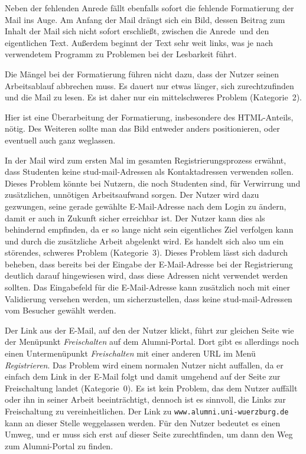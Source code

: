 {
Neben der fehlenden Anrede fällt ebenfalls sofort die fehlende Formatierung der Mail ins Auge. Am Anfang der Mail drängt sich ein Bild, dessen Beitrag zum Inhalt der Mail sich nicht sofort erschließt, zwischen die \glqq Anrede\grqq ~und den eigentlichen Text. Außerdem beginnt der Text sehr weit links, was je nach verwendetem Programm zu Problemen bei der Lesbarkeit führt.
}
{

Die Mängel bei der Formatierung führen nicht dazu, dass der Nutzer seinen Arbeitsablauf abbrechen muss. Es dauert nur etwas länger, sich zurechtzufinden und die Mail zu lesen. Es ist daher nur ein mittelschweres Problem (Kategorie~2).
}
{
Hier ist eine Überarbeitung der Formatierung, insbesondere des HTML-Anteils, nötig. Des Weiteren sollte man das Bild entweder anders positionieren, oder eventuell auch ganz weglassen.
}
\label{prob:frei:mailformat}

{
In der Mail wird zum ersten Mal im gesamten Registrierungsprozess erwähnt, dass Studenten keine stud\hbox{-}mail-Adressen als Kontaktadressen verwenden sollen.
}
{
Dieses Problem könnte bei Nutzern, die noch Studenten sind, für Verwirrung und zusätzlichen, unnötigen Arbeitsaufwand sorgen. Der Nutzer wird dazu gezwungen, seine gerade gewählte E\hbox{-}Mail-Adresse nach dem Login zu ändern, damit er auch in Zukunft sicher erreichbar ist. Der Nutzer kann dies als behindernd empfinden, da er so lange nicht sein eigentliches Ziel verfolgen kann und durch die zusätzliche Arbeit abgelenkt wird. Es handelt sich also um ein störendes, schweres Problem (Kategorie~3).
}
{
Dieses Problem lässt sich dadurch beheben, dass bereits bei der Eingabe der E\hbox{-}Mail-Adresse bei der Registrierung deutlich darauf hingewiesen wird, dass diese Adressen nicht verwendet werden sollten. Das Eingabefeld für die E\hbox{-}Mail-Adresse kann zusätzlich noch mit einer Validierung versehen werden, um sicherzustellen, dass keine stud\hbox{-}mail-Adressen vom Besucher gewählt werden.
}
\label{prob:frei:studmail}

{
Der Link aus der E\hbox{-}Mail, auf den der Nutzer klickt, führt zur gleichen Seite wie der Menüpunkt \emph{Freischalten} auf dem Alumni-Portal. Dort gibt es allerdings noch einen Untermenüpunkt \emph{Freischalten} mit einer anderen URL im Menü  \emph{ Registrieren}.
}
{
Das Problem wird einem normalen Nutzer nicht auffallen, da er einfach dem Link in der E\hbox{-}Mail folgt und damit umgehend auf der Seite zur Freischaltung landet (Kategorie~0).
}
{
Es ist kein Problem, das dem Nutzer auffällt oder ihn in seiner Arbeit beeinträchtigt, dennoch ist es sinnvoll, die Links zur Freischaltung zu vereinheitlichen. Der Link zu \texttt{www.alumni.uni-wuerzburg.de} kann an dieser Stelle weggelassen werden. Für den Nutzer bedeutet es einen Umweg, und er muss sich erst auf dieser Seite zurechtfinden, um dann den Weg zum Alumni-Portal zu finden.
}
\label{prob:frei:link}

